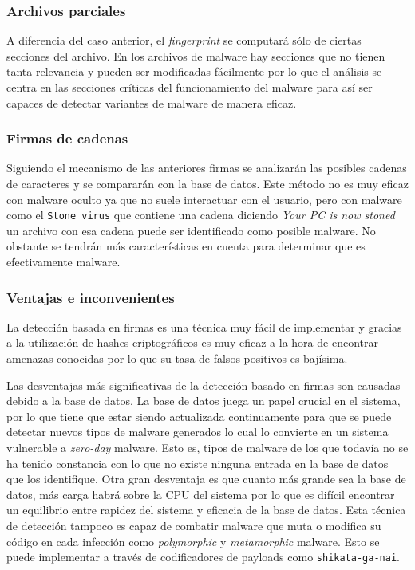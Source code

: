 \documentclass[12pt]{article}
\newcommand{\newpar} {
    \vskip 0.5cm
}
\begin{document}
            \subsubsection{Archivos parciales}
                A diferencia del caso anterior, el \textit{fingerprint} se computará sólo de ciertas secciones del archivo. En los archivos de malware hay secciones que no tienen tanta relevancia y pueden ser modificadas fácilmente por lo que el análisis se centra en las secciones críticas del funcionamiento del malware para así ser capaces de detectar variantes de malware de manera eficaz.

            \subsubsection{Firmas de cadenas}
                Siguiendo el mecanismo de las anteriores firmas se analizarán las posibles cadenas de caracteres y se compararán con la base de datos. Este método no es muy eficaz con malware oculto ya que no suele interactuar con el usuario, pero con malware como el \texttt{Stone virus} que contiene una cadena diciendo \textit{Your PC is now stoned} un archivo con esa cadena puede ser identificado como posible malware. No obstante se tendrán más características en cuenta para determinar que es efectivamente malware.

            \subsubsection{Ventajas e inconvenientes}
                La detección basada en firmas es una técnica muy fácil de implementar y gracias a la utilización de hashes criptográficos es muy eficaz a la hora de encontrar amenazas conocidas por lo que su tasa de falsos positivos es bajísima.

                \newpar

                Las desventajas más significativas de la detección basado en firmas son causadas debido a la base de datos. La base de datos juega un papel crucial en el sistema, por lo que tiene que estar siendo actualizada continuamente para que se puede detectar nuevos tipos de malware generados lo cual lo convierte en un sistema vulnerable a \textit{zero-day} malware. Esto es, tipos de malware de los que todavía no se ha tenido constancia con lo que no existe ninguna entrada en la base de datos que los identifique. Otra gran desventaja es que cuanto más grande sea la base de datos, más carga habrá sobre la CPU del sistema por lo que es difícil encontrar un equilibrio entre rapidez del sistema y eficacia de la base de datos. Esta técnica de detección tampoco es capaz de combatir malware que muta o modifica su código en cada infección como \textit{polymorphic} y \textit{metamorphic} malware. Esto se puede implementar a través de codificadores de payloads como \texttt{shikata-ga-nai}.
\end{document}
